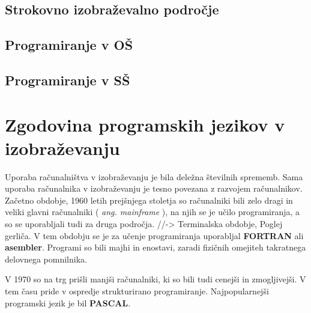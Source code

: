 
\subsection{Strokovno izobraževalno področje}
\label{sec:strokovno_izo_področje}


\subsection{Programiranje v OŠ}
\label{sec:Programiranje_v_OŠ}

\subsection{Programiranje v SŠ}
\label{sec:Programiranje_v_SŠ}

\section{Zgodovina programskih jezikov v izobraževanju}
\label{sec:zgodovina_programskih_jezikov}




Uporaba računalništva v izobraževanju je bila deležna številnih
sprememb. Sama uporaba računalnika v izobraževanju je tesno
povezana z razvojem računalnikov.  Začetno obdobje, 1960 letih
prejšnjega stoletja so računalniki bili zelo dragi in veliki glavni
računalniki ( \emph{ang. mainframe} ), na njih se je učilo
programiranja, a so se uporabljali tudi za druga področja.
//-\textgreater{} Terminalska obdobje, Poglej gerliča. V tem obdobju
se je za učenje programiranja uporabljal \textbf{FORTRAN} ali
\textbf{asembler}. Programi so bili majhi in enostavi, zaradi fizičnih
omejiteh takratnega delovnega pomnilnika.

V 1970 so na trg prišli manjši računalniki, ki so bili tudi cenejši in
zmogljivejši. V tem času pride v ospredje strukturirano programiranje.
Najpopularnejši programski jezik je bil \textbf{PASCAL}.

